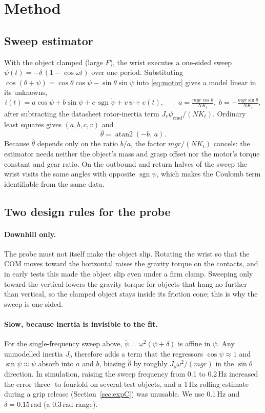 \documentclass[11pt]{article}
\newcommand{\sgn}{\operatorname{sgn}}
\begin{document}
\section{Method}\label{sec:method}
\subsection{Sweep estimator}
With the object clamped (large $F$), the wrist executes a one-sided sweep $\psi(t) = -\delta\,(1-\cos\omega t)$ over one period. Substituting $\cos(\theta+\psi) = \cos\theta\cos\psi - \sin\theta\sin\psi$ into \eqref{eq:motor} gives a model linear in its unknowns,
\begin{equation}
i(t) = a\cos\psi + b\sin\psi + c\,\sgn\dot\psi + v\,\dot\psi + e(t), \qquad a = \tfrac{mgr\cos\theta}{NK_t},\; b = -\tfrac{mgr\sin\theta}{NK_t}, \label{eq:regression}
\end{equation}
after subtracting the datasheet rotor-inertia term $J_r\ddot\psi_{\mathrm{cmd}}/(NK_t)$. Ordinary least squares gives $(a,b,c,v)$ and
\begin{equation}
\hat\theta = \operatorname{atan2}(-b,\,a).
\end{equation}
Because $\hat\theta$ depends only on the ratio $b/a$, the factor $mgr/(NK_t)$ cancels: the estimator needs neither the object's mass and grasp offset nor the motor's torque constant and gear ratio. On the outbound and return halves of the sweep the wrist visits the same angles with opposite $\sgn\dot\psi$, which makes the Coulomb term identifiable from the same data.

\subsection{Two design rules for the probe}
\paragraph{Downhill only.} The probe must not itself make the object slip. Rotating the wrist so that the COM moves toward the horizontal raises the gravity torque on the contacts, and in early tests this made the object slip even under a firm clamp. Sweeping only toward the vertical lowers the gravity torque for objects that hang no further than vertical, so the clamped object stays inside its friction cone; this is why the sweep is one-sided.

\paragraph{Slow, because inertia is invisible to the fit.} For the single-frequency sweep above, $\ddot\psi = \omega^2(\psi+\delta)$ is affine in $\psi$. Any unmodelled inertia $J_o$ therefore adds a term that the regressors $\cos\psi\approx 1$ and $\sin\psi\approx\psi$ absorb into $a$ and $b$, biasing $\hat\theta$ by roughly $J_o\omega^2/(mgr)$ in the $\sin\theta$ direction. In simulation, raising the sweep frequency from 0.1 to 0.2\,Hz increased the error three- to fourfold on several test objects, and a 1\,Hz rolling estimate during a grip release (Section~\ref{sec:expC}) was unusable. We use 0.1\,Hz and $\delta=0.15$\,rad (a 0.3\,rad range).
\end{document}
